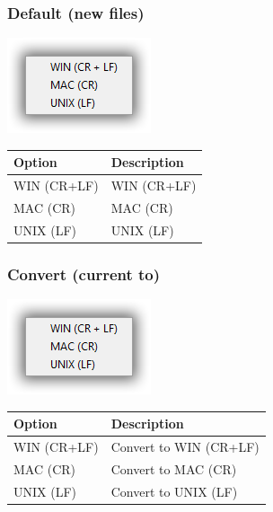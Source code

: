 \newpage
\hypertarget{menu_format_eol_default}{}
\subsubsection{Default (new files) }

\includegraphics[scale=0.50]{./res/eol.png}\\

\begin{scriptsize}
  \begin{tabularx}{\textwidth}{>{\hsize=0.3\hsize}X>{\hsize=0.7\hsize}X}\\
    \hline
    \textbf{Option} & \textbf{Description} \\
    \hline
    WIN (CR+LF) & WIN (CR+LF) \\
    MAC (CR) & MAC (CR) \\
    UNIX (LF) & UNIX (LF) \\
    \hline
  \end{tabularx}
\end{scriptsize}


\hypertarget{menu_format_eol_convert}{}
\subsubsection{Convert (current to)}

\includegraphics[scale=0.50]{./res/eol.png}\\

\begin{scriptsize}
  \begin{tabularx}{\textwidth}{>{\hsize=0.3\hsize}X>{\hsize=0.7\hsize}X}\\
    \hline
    \textbf{Option} & \textbf{Description} \\
    \hline
    WIN (CR+LF) & Convert to WIN (CR+LF) \\
    MAC (CR) & Convert to MAC (CR) \\
    UNIX (LF) & Convert to UNIX (LF) \\
    \hline
  \end{tabularx}
\end{scriptsize}



